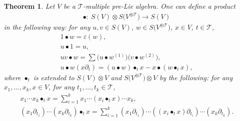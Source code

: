 \documentclass[pdftex]{sigma}
\numberwithin{equation}{section}
\newtheorem{Theorem}{Theorem}[section]
\newcommand{\T}{\mathcal{T}}
\begin{document}
\begin{Theorem}
Let $V$ be a $\T$-multiple pre-Lie algebra. One can define a product
\begin{gather*}
\bullet\colon\ S(V)\otimes S\big(V^{\oplus\T}\big)\longrightarrow S(V)
\end{gather*}
in the following way: for any $u,v \in S(V)$, $w\in S\big(V^{\oplus\T}\big)$, $x\in V$, $t\in \T$,
\begin{gather*}
1\bullet w=\varepsilon(w),
\\
u\bullet 1=u,
\\
uv\bullet w=\sum\big(u\bullet w^{(1)}\big)\big(v\bullet w^{(2)}\big),
\\
u\bullet w (x\partial_t)=(u\bullet w)\bullet_t x-x\bullet (w\bullet_t x),
\end{gather*}
where $\bullet_t$ is extended to $S(V)\otimes V$ and $S\big(V^{\oplus\T}\big)\otimes V$
by the following: for any $x_1,\dots,x_k,x\in V$, for any $t_1,\dots,t_k \in \T$,
\begin{gather*}
x_1\cdots x_k \bullet_t x=\sum_{i=1}^k x_1\cdots (x_i\bullet_t x)\cdots x_k,
\\
(x_1\partial_{t_1})\cdots (x_k\partial_{t_k}) \bullet_t x
=\sum_{i=1}^k (x_1\partial_{t_1})\cdots ((x_i\bullet_t x)\partial_{t_i})\cdots (x_k\partial_{t_k}).
\end{gather*}
\end{Theorem}
\end{document}
